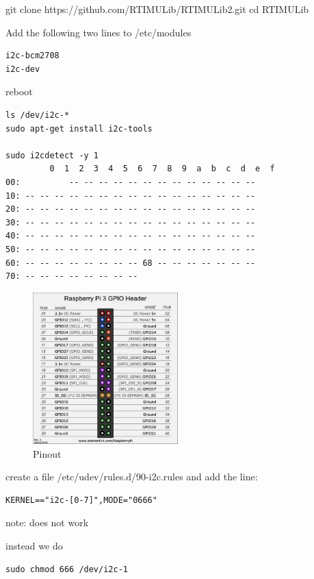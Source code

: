 git clone https://github.com/RTIMULib/RTIMULib2.git cd RTIMULib

Add the following two lines to /etc/modules

\begin{verbatim}
i2c-bcm2708
i2c-dev
\end{verbatim}

reboot

\begin{verbatim}
ls /dev/i2c-*
sudo apt-get install i2c-tools

sudo i2cdetect -y 1
         0  1  2  3  4  5  6  7  8  9  a  b  c  d  e  f
00:          -- -- -- -- -- -- -- -- -- -- -- -- -- 
10: -- -- -- -- -- -- -- -- -- -- -- -- -- -- -- -- 
20: -- -- -- -- -- -- -- -- -- -- -- -- -- -- -- -- 
30: -- -- -- -- -- -- -- -- -- -- -- -- -- -- -- -- 
40: -- -- -- -- -- -- -- -- -- -- -- -- -- -- -- -- 
50: -- -- -- -- -- -- -- -- -- -- -- -- -- -- -- -- 
60: -- -- -- -- -- -- -- -- 68 -- -- -- -- -- -- -- 
70: -- -- -- -- -- -- -- --
\end{verbatim}

\begin{figure}[htb]
\centering
\includegraphics[width=0.5\textwidth]{images/rasp3.jpg}
\caption{Pinout}
\end{figure}

create a file /etc/udev/rules.d/90-i2c.rules and add the line:

\begin{verbatim}
KERNEL=="i2c-[0-7]",MODE="0666"
\end{verbatim}

note: does not work

instead we do

\begin{verbatim}
sudo chmod 666 /dev/i2c-1 
\end{verbatim}

